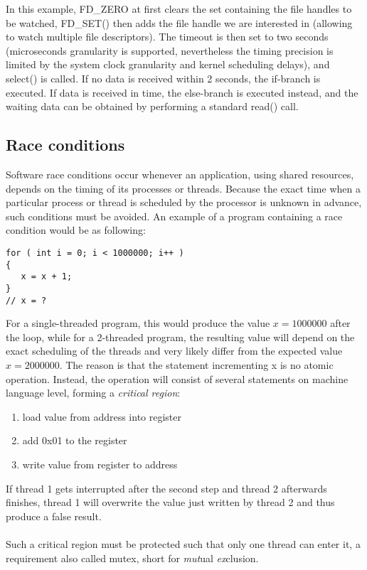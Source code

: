 In this example, FD\_ZERO at first clears the set containing the file handles to be watched, FD\_SET() then adds the file handle we are interested in (allowing to watch multiple file
descriptors). The timeout is then set to two seconds 
(microseconds granularity is supported, nevertheless the timing precision is limited by the system clock granularity and kernel scheduling delays), and select() is called. If no data is
received within 2 seconds, the if-branch is executed. If data is received in time, the else-branch is executed instead, and the waiting data can be obtained by performing a standard
read() call.

\subsection{Race conditions}
Software race conditions occur whenever an application, using shared resources, depends on the timing of its processes or threads.
Because the exact time when a particular process or thread is scheduled by the processor is unknown in advance, such conditions must be avoided.
An example of a program containing a race condition would be as following:
\begin{lstlisting}[style=cStyle,caption={Race condition},label=lst:raceCond]
for ( int i = 0; i < 1000000; i++ )
{
   x = x + 1; 
}
// x = ?
\end{lstlisting}
For a single-threaded program, this would produce the value $x=1000000$ after the loop, while for a 2-threaded program, the resulting value will depend on the exact scheduling of the
threads and very likely differ from the expected value $x=2000000$. The reason is that the statement incrementing x is no atomic operation. Instead, the operation will consist of
several statements on machine language level, forming a \textit{critical region}:
\begin{enumerate}
 \item load value from address into register
 \item add 0x01 to the register
 \item write value from register to address
\end{enumerate}
If thread 1 gets interrupted after the second step and thread 2 afterwards finishes, thread 1 will overwrite the value just written by thread 2 and thus produce a false result.
\\
\\
Such a critical region must be protected such that only one thread can enter it, a requirement also called mutex, short for \textit{mut}ual \textit{ex}clusion.
